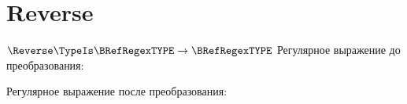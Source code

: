 \section{Reverse}
\begin{frame}{$\Reverse\TypeIs\BRefRegexTYPE\to\BRefRegexTYPE$}
	Регулярное выражение до преобразования:

	Регулярное выражение после преобразования:

\end{frame}